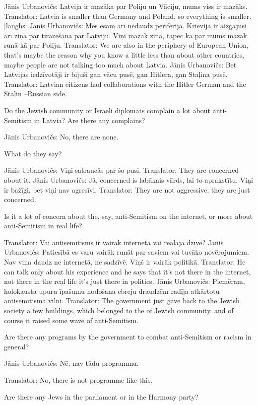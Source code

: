 Jānis Urbanovičs: Latvija ir mazāka par Poliju un Vāciju, mums viss ir mazāks.  
Translator: Latvia is smaller than Germany and Poland, so everything is smaller. [laughs] 
Jānis Urbanovičs: Mēs esam arī nedaudz perifērijā. Krievijā ir aizgājusi arī ziņa par tirazēšanā par Latviju. Viņi mazāk zina, tāpēc ka par mums mazāk runā kā par Poliju.  
Translator: We are also in the periphery of European Union, that’s maybe the reason why you know a little less than about other countries, maybe people are not talking too much about Latvia. 
Jānis Urbanovičs: Bet Latvijas iedzīvotāji ir bijuši gan vācu pusē, gan Hitlera, gan Staļina pusē.  
Translator: Latvian citizens had collaborations with the Hitler German and the Stalin –Russian side. 

Do the Jewish community or Israeli diplomats complain a lot about anti-Semitism in Latvia? Are there any complains?  

Jānis Urbanovičs: No, there are none. 

What do they say?  

Jānis Urbanovičs: Viņi satraucās par šo pusi.  
Translator: They are concerned about it.  
Jānis Urbanovičs: Jā, concerned is labākais vārds, lai to aprakstītu. Viņi ir bažīgi, bet viņi nav agresīvi. Translator: They are not aggressive, they are just concerned.  

Is it a lot of concern about the, say, anti-Semitism on the internet, or more about anti-Semitism in real life?  

Translator: Vai antisemītisms ir vairāk internetā vai reālajā dzīvē?  
Jānis Urbanovičs: Patiesībā es varu vairāk runāt par saviem vai tuvāko novērojumiem. Nav viņa daudz ne internetā, ne sadzīvē. Viņš ir vairāk politikā.  
Translator: He can talk only about his experience and he says that it's not there in the internet, not there in the real life it’s just there in politics.  
Jānis Urbanovičs: Piemēram, holokausta upuru īpašumu nodošana ebreju draudzēm radīja atkārtotu antisemītisma vilni.  
Translator: The government just gave back to the Jewish society a few buildings, which belonged to the of Jewish community, and of course it raised some wave of anti-Semitism.  

Are there any programs by the government to combat anti-Semitism or racism in general?  

Jānis Urbanovičs: Nē, nav tādu programmu. 

Translator: No, there is not programme like this.  

Are there any Jews in the parliament or in the Harmony party?  


